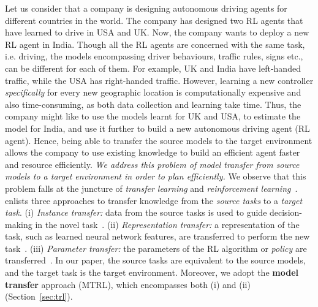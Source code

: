 Let us consider that a company is designing autonomous driving agents for different countries in the world. The company has designed two RL agents that have learned to drive in USA and UK. Now, the company wants to deploy a new RL agent in India. Though all the RL agents are concerned with the same task, i.e. driving, the models encompassing driver behaviours, traffic rules, signs etc., can be different for each of them. For example, UK and India have left-handed traffic, while the USA has right-handed traffic.  However, learning a new controller \emph{specifically} for every new geographic location is computationally expensive and also time-consuming, as both data collection and learning take time. Thus, the company might like to use the models learnt for UK and USA, to estimate the model for India, and use it further to build a new autonomous driving agent (RL agent). Hence, being able to transfer the source models to the target environment allows the company to use existing knowledge to build an efficient agent faster and resource efficiently.
\textit{We address this problem of model transfer from source models to a target environment in order to plan efficiently.} We observe that this problem falls at the juncture of \emph{transfer learning} and \emph{reinforcement learning}~\citep{taylor2009transfer,lazaric2012transfer,laroche2017transfer}. %
\citet{lazaric2012transfer} enlists three approaches to transfer knowledge from the \emph{source tasks} to a \emph{target task}. (i) \emph{Instance transfer:} data from the source tasks is used to guide decision-making in the novel task~\citep{taylor2008transferring}. (ii) \emph{Representation transfer:} a representation of the task, such as learned neural network features, are transferred to perform the new task~\citep{zhang2018decoupling}. (iii) \emph{Parameter transfer:} the parameters of the RL algorithm or \emph{policy} are transferred~\citep{rusu2015policy}. In our paper, the source tasks are equivalent to the source models, and the target task is the target environment. Moreover, we adopt the \textbf{model transfer} approach (MTRL), which encompasses both (i) and (ii) (Section~\ref{sec:trl}). 

